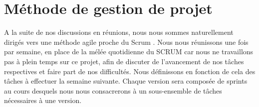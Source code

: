 \section{Méthode de gestion de projet}
	\label{sec:gestion}


A la suite de nos discussions en réunions, nous nous sommes naturellement dirigés vers une méthode agile proche du \og Scrum \fg. Nous nous réunissons une fois par semaine, en place de la mélée quotidienne du SCRUM car nous ne travaillons pas à plein temps sur ce projet, afin de discuter de l'avancement de nos tâches respectives et faire part de nos difficultés. Nous définissons en fonction de cela des tâches à effectuer la semaine suivante. 
	Chaque version sera composée de sprints au cours desquels nous nous consacrerons à un sous-ensemble de tâches nécessaires à une version. %
	
